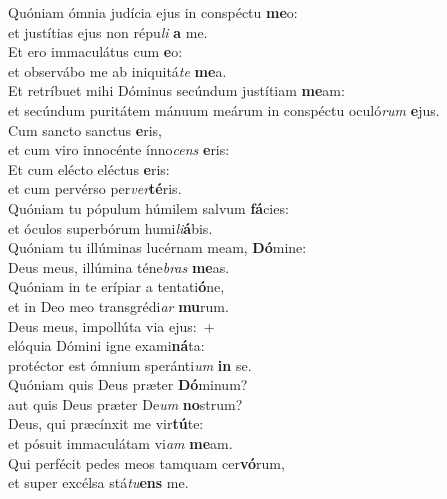 \oddverse Quóniam ómnia judícia ejus in conspéctu \textbf{me}o:~\*\\
\oddverse et justítias ejus non répu\textit{li} \textbf{a} me.\\
\evenverse Et ero immaculátus cum \textbf{e}o:~\*\\
\evenverse et observábo me ab iniquitá\textit{te} \textbf{me}a.\\
\oddverse Et retríbuet mihi Dóminus secúndum justítiam \textbf{me}am:~\*\\
\oddverse et secúndum puritátem mánuum meárum in conspéctu oculó\textit{rum} \textbf{e}jus.\\
\evenverse Cum sancto sanctus \textbf{e}ris,~\*\\
\evenverse et cum viro innocénte ínno\textit{cens} \textbf{e}ris:\\
\oddverse Et cum elécto eléctus \textbf{e}ris:~\*\\
\oddverse et cum pervérso per\textit{ver}\textbf{té}ris.\\
\evenverse Quóniam tu pópulum húmilem salvum \textbf{fá}cies:~\*\\
\evenverse et óculos superbórum humi\textit{li}\textbf{á}bis.\\
\oddverse Quóniam tu illúminas lucérnam meam, \textbf{Dó}mine:~\*\\
\oddverse Deus meus, illúmina téne\textit{bras} \textbf{me}as.\\
\evenverse Quóniam in te erípiar a tentati\textbf{ó}ne,~\*\\
\evenverse et in Deo meo transgrédi\textit{ar} \textbf{mu}rum.\\
\oddverse Deus meus, impollúta via ejus:~+\\
\oddverse  elóquia Dómini igne exami\textbf{ná}ta:~\*\\
\oddverse protéctor est ómnium speránti\textit{um} \textbf{in} se.\\
\evenverse Quóniam quis Deus præter \textbf{Dó}minum?~\*\\
\evenverse aut quis Deus præter De\textit{um} \textbf{no}strum?\\
\oddverse Deus, qui præcínxit me vir\textbf{tú}te:~\*\\
\oddverse et pósuit immaculátam vi\textit{am} \textbf{me}am.\\
\evenverse Qui perfécit pedes meos tamquam cer\textbf{vó}rum,~\*\\
\evenverse et super excélsa stá\textit{tu}\textbf{ens} me.\\

